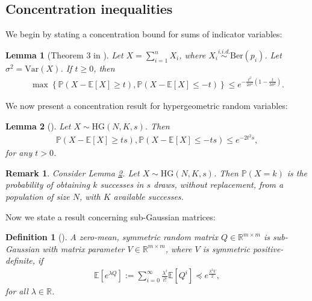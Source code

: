 \documentclass{article}
\newtheorem{remark}{Remark}
\newtheorem{definition}{Definition}
\newtheorem{lemma}{Lemma}
\begin{document}
\subsection{Concentration inequalities}

We begin by stating a concentration bound for sums of indicator variables:
\begin{lemma}[Theorem $3$ in \cite{janson2016large}]
\label{lemma:Bern_Conc_Janson_2016}
Let $X = \sum_{i = 1}^nX_i$, where $X_i \overset{i.i.d.}{\sim} \mathrm{Ber}(p_i)$. Let $\sigma^2 = \mathrm{Var}(X)$. If $t \geq 0$, then
\begin{align*}
\max\left\{\mathbb{P}(X - \mathbb{E}[X] \geq t), \mathbb{P}(X - \mathbb{E}[X] \leq -t)\right\} \leq e^{-\frac{t^2}{2\sigma^2}\left(1 - \frac{t}{3\sigma^2}\right)}.
\end{align*}
\end{lemma}

We now present a concentration result for hypergeometric random variables:

\begin{lemma}[\cite{hoeffding1963probability}]
\label{lemma:hypergeom_conc}
Let $X \sim \mathrm{HG}(N, K, s)$. Then
\begin{align*}
\mathbb{P}(X - \mathbb{E}[X] \geq ts), \mathbb{P}(X - \mathbb{E}[X] \leq -ts) \leq e^{-2t^2s},
\end{align*}
for any $t > 0$.
\end{lemma}

\begin{remark}
Consider Lemma \ref{lemma:hypergeom_conc}. Let $X \sim \mathrm{HG}(N, K, s)$. Then $\mathbb{P}(X = k)$ is the probability of obtaining $k$ successes in $s$ draws, without replacement, from a population of size $N$, with $K$ available successes.
\end{remark}

Now we state a result concerning sub-Gaussian matrices:

\begin{definition}[\cite{wainwright2019high}]
A zero-mean, symmetric random matrix $Q \in \mathbb{R}^{m \times m}$ is sub-Gaussian with
matrix parameter $V \in \mathbb{R}^{m \times m}$, where $V$ is symmetric positive-definite, if
\begin{align*}
\mathbb{E}\left[e^{\lambda Q}\right] := \sum_{i = 0}^\infty\frac{\lambda^i}{i!}\mathbb{E}\left[Q^i\right] \preceq e^{\frac{\lambda^2V}{2}}, 
\end{align*}
for all $\lambda \in \mathbb{R}$.
\end{definition}
\end{document}
